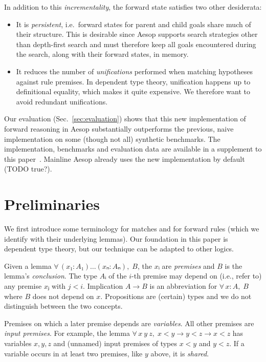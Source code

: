 \documentclass[runningheads]{llncs}
\newcommand{\All}[2]{\ensuremath{\forall\, #1,\; #2}}
\begin{document}
In addition to this \emph{incrementality}, the forward state satisfies two other desiderata:
\begin{itemize}
  \item It is \emph{persistent}, i.e.\ forward states for parent and child goals share much of their structure.
        This is desirable since Aesop supports search strategies other than depth-first search and must therefore keep all goals encountered during the search, along with their forward states, in memory.
  \item It reduces the number of \emph{unifications} performed when matching hypotheses against rule premises.
        In dependent type theory, unification happens up to definitional equality, which makes it quite expensive.
        We therefore want to avoid redundant unifications.
\end{itemize}

Our evaluation (Sec.~\ref{sec:evaluation}) shows that this new implementation of forward reasoning in Aesop substantially outperforms the previous, naive implementation on some (though not all) synthetic benchmarks.
The implementation, benchmarks and evaluation data are available in a supplement to this paper~\cite{supplement}.
Mainline Aesop already uses the new implementation by default (TODO true?).

\section{Preliminaries}

We first introduce some terminology for matches and for forward rules (which we identify with their underlying lemmas).
Our foundation in this paper is dependent type theory, but our technique can be adapted to other logics.

Given a lemma $\All{(x₁ : A₁) \dots (xₙ : Aₙ)}{B}$, the $xᵢ$ are \emph{premises} and $B$ is the lemma's \emph{conclusion}.
The type $Aᵢ$ of the $i$-th premise may depend on (i.e., refer to) any premise $xⱼ$ with $j < i$.
Implication $A → B$ is an abbreviation for $\All{x : A}{B}$ where $B$ does not depend on $x$.
Propositions are (certain) types and we do not distinguish between the two concepts.

Premises on which a later premise depends are \emph{variables}.
All other premises are \emph{input premises}.
For example, the lemma $\All{x~y~z}{x < y → y < z → x < z}$ has variables $x, y, z$ and (unnamed) input premises of types $x < y$ and $y < z$.
If a variable occurs in at least two premises, like $y$ above, it is \emph{shared}.
\end{document}
